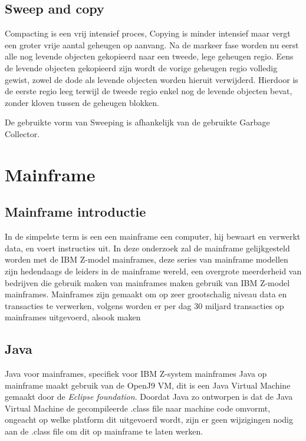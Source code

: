 \subsection{Sweep and copy}
Compacting is een vrij intensief proces, Copying is minder intensief maar vergt een groter vrije aantal geheugen op aanvang.
Na de markeer fase worden nu eerst alle nog levende objecten gekopieerd naar een tweede, lege geheugen regio.
Eens de levende objecten gekopieerd zijn wordt de vorige geheugen regio volledig gewist, zowel de dode als levende objecten worden hieruit verwijderd.
Hierdoor is de eerste regio leeg terwijl de tweede regio enkel nog de levende objecten bevat, zonder kloven tussen de geheugen blokken.

De gebruikte vorm van Sweeping is afhankelijk van de gebruikte Garbage Collector.
\autocite{Putten2022}


\section{Mainframe}
\label{sec:mainframe}
\subsection{Mainframe introductie}
\label{sec:mainframe introductie}

In de simpelste term is een een mainframe een computer, hij bewaart en verwerkt data, en voert instructies uit.
In deze onderzoek zal de mainframe gelijkgesteld worden met de IBM Z-model mainframes, deze series van mainframe modellen zijn hedendaags de leiders in de mainframe wereld, een overgrote meerderheid van bedrijven die gebruik maken van mainframes maken gebruik van IBM Z-model mainframes.
Mainframes zijn gemaakt om op zeer grootschalig niveau data en transacties te verwerken, volgens \textcite{Critchley2021} worden er per dag 30 miljard transacties op mainframes uitgevoerd, alsook maken %



\subsection{Java}
\label{sec:mainframe java}
Java voor mainframes, specifiek voor IBM Z-system mainframes %
Java op mainframe maakt gebruik van de OpenJ9 VM, dit is een Java Virtual Machine gemaakt door de \textit{Eclipse foundation}.
Doordat Java zo ontworpen is dat de Java Virtual Machine de gecompileerde .class file naar machine code omvormt, ongeacht op welke platform dit uitgevoerd wordt, zijn er geen wijzigingen nodig aan de .class file om dit op mainframe te laten werken.


